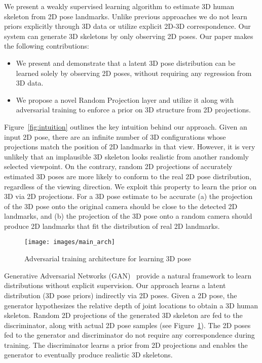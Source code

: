 \documentclass[runningheads]{llncs}
\begin{document}
We present a weakly supervised learning algorithm to estimate 3D human skeleton from 2D pose landmarks. Unlike previous approaches we do not learn priors explicitly through 3D data or utilize explicit 2D-3D correspondence. Our system can generate 3D skeletons by only observing 2D poses.
Our paper makes the following contributions:
\begin{itemize}
	\setlength{\itemsep}{0pt}
	\setlength{\leftmargin}{0in}
	\item We present and demonstrate that a latent 3D pose distribution can be learned solely by observing 2D poses, without requiring any regression from 3D data.
	\item We propose a novel Random Projection layer and utilize it along with adversarial training to enforce a prior on 3D structure from 2D projections.
\end{itemize}Figure~\ref{fig:intuition} outlines the key intuition behind our approach. Given an input 2D pose, there are an infinite number of 3D configurations whose projections match the position of 2D landmarks in that view. However, it is very unlikely that an implausible 3D skeleton looks realistic from another randomly selected viewpoint. On the contrary, random 2D projections of accurately estimated 3D poses are more likely to conform to the real 2D pose distribution, regardless of the viewing direction. We exploit this property to learn the prior on 3D via 2D projections. For a 3D pose estimate to be accurate (a) the projection of the 3D pose onto the original camera should be close to the detected 2D landmarks, and (b) the projection of the 3D pose onto a random camera should produce 2D landmarks that fit the distribution of real 2D landmarks.

\begin{figure}[t]
	\centering
	\texttt{[image: images/main\_arch]}
	\caption{Adversarial training architecture for learning 3D pose}
	\label{fig:mainarch}
\end{figure}

Generative Adversarial Networks (GAN)~\cite{GAN} provide a natural framework to learn distributions without explicit supervision. Our approach learns a latent distribution (3D pose priors) indirectly via  2D poses. Given a 2D pose, the generator hypothesizes the relative depth of joint locations to obtain a 3D human skeleton. Random 2D projections of the generated 3D skeleton are fed to the discriminator, along with actual 2D pose samples (see Figure~\ref{fig:mainarch}). The 2D poses fed to the generator and discriminator do not require any correspondence during training. The discriminator learns a prior from 2D projections and enables the generator to eventually produce realistic 3D skeletons.
\end{document}
